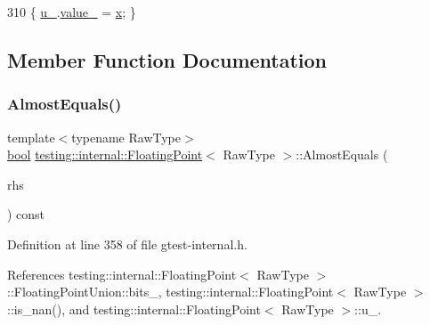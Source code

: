 \begin{DoxyCode}
310 \{ \hyperlink{classtesting_1_1internal_1_1FloatingPoint_a2e0b6bd427248b91476f3fca281f7104}{u\_}.\hyperlink{uniontesting_1_1internal_1_1FloatingPoint_1_1FloatingPointUnion_a4ee324889f70577721393e8e1920e4c6}{value\_} = \hyperlink{namespaceinteractive__marker_acda52804aef30b460a72fb21ee01d69d}{x}; \}
\end{DoxyCode}


\subsection{Member Function Documentation}
\mbox{\label{classtesting_1_1internal_1_1FloatingPoint_a965214c1af2f9ac5adb1393794aa81e5}} 
\subsubsection{\texorpdfstring{Almost\+Equals()}{AlmostEquals()}}
{\footnotesize\ttfamily template$<$typename Raw\+Type$>$ \\
\hyperlink{classbool}{bool} \hyperlink{classtesting_1_1internal_1_1FloatingPoint}{testing\+::internal\+::\+Floating\+Point}$<$ Raw\+Type $>$\+::Almost\+Equals (\begin{DoxyParamCaption}\item[{const \hyperlink{classtesting_1_1internal_1_1FloatingPoint}{Floating\+Point}$<$ Raw\+Type $>$ \&}]{rhs }\end{DoxyParamCaption}) const\hspace{0.3cm}{\ttfamily [inline]}}



Definition at line 358 of file gtest-\/internal.\+h.



References testing\+::internal\+::\+Floating\+Point$<$ Raw\+Type $>$\+::\+Floating\+Point\+Union\+::bits\+\_\+, testing\+::internal\+::\+Floating\+Point$<$ Raw\+Type $>$\+::is\+\_\+nan(), and testing\+::internal\+::\+Floating\+Point$<$ Raw\+Type $>$\+::u\+\_\+.


